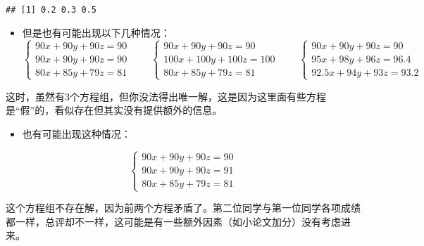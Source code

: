 \documentclass[hyperref,]{ctexart}
\providecommand{\tightlist}{%
  \setlength{\itemsep}{0pt}\setlength{\parskip}{0pt}}
\begin{document}
\begin{verbatim}
## [1] 0.2 0.3 0.5
\end{verbatim}

\begin{itemize}
\tightlist
\item
  但是也有可能出现以下几种情况： \footnotesize{
  \begin{equation}
  \left\{
  \begin{aligned}
  90x+90y+90z=90\\
  90x+90y+90z=90\\
  80x+85y+79z=81
  \end{aligned}\right.
  \qquad
  \left\{
  \begin{aligned}
  90x+90y+90z=90\\
  100x+100y+100z=100\\
  80x+85y+79z=81
  \end{aligned}\right.
  \qquad
  \left\{
  \begin{aligned}
  90x+90y+90z=90\\
  95x+98y+96z=96.4\\
  92.5x+94y+93z=93.2
  \end{aligned}\right.
  \end{equation}
  }
\end{itemize}

这时，虽然有3个方程组，但你没法得出唯一解，这是因为这里面有些方程是``假''的，看似存在但其实没有提供额外的信息。

\begin{itemize}
\tightlist
\item
  也有可能出现这种情况：
\end{itemize}

\begin{equation}
\left\{
\begin{aligned}
90x+90y+90z=90\\
90x+90y+90z=91\\
80x+85y+79z=81
\end{aligned}\right.
\end{equation}

这个方程组不存在解，因为前两个方程矛盾了。第二位同学与第一位同学各项成绩都一样，总评却不一样，这可能是有一些额外因素（如小论文加分）没有考虑进来。
\end{document}
